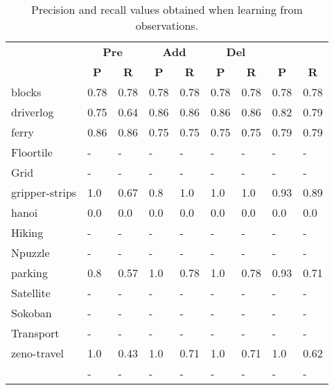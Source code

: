 \documentclass{article}
\begin{document}
\begin{table}
	\begin{footnotesize}
		\begin{center}
			\begin{tabular}{l|l|l|l|l|l|l||l|l|}
				& \multicolumn{2}{|c|}{\bf Pre} & \multicolumn{2}{|c|}{\bf Add} & \multicolumn{2}{|c||}{\bf Del} & \multicolumn{2}{|c}{\bf}\\ \cline{2-9}			
				& \multicolumn{1}{|c|}{\bf P} & \multicolumn{1}{|c|}{\bf R} & \multicolumn{1}{|c|}{\bf P} & \multicolumn{1}{|c|}{\bf R} & \multicolumn{1}{|c|}{\bf P} & \multicolumn{1}{|c||}{\bf R} &  \multicolumn{1}{|c|}{\bf P} & \multicolumn{1}{|c|}{\bf R} \\
				\hline
				blocks & 0.78 & 0.78 & 0.78 & 0.78 & 0.78 & 0.78 & 0.78 & 0.78 \\
				driverlog & 0.75 & 0.64 & 0.86 & 0.86 & 0.86 & 0.86 & 0.82 & 0.79 \\
				ferry & 0.86 & 0.86 & 0.75 & 0.75 & 0.75 & 0.75 & 0.79 & 0.79 \\
				Floortile & - & - & - & - & - & - & - & - \\ %
				Grid & - & - & - & - & - & - & - & - \\ %
				gripper-strips & 1.0 & 0.67 & 0.8 & 1.0 & 1.0 & 1.0 & 0.93 & 0.89 \\
				hanoi & 0.0 & 0.0 & 0.0 & 0.0 & 0.0 & 0.0 & 0.0 & 0.0 \\                                                                                                                                                                                     
				Hiking & - & - & - & - & - & - & - & - \\ %
				Npuzzle & - & - & - & - & - & - & - & - \\ %
				parking & 0.8 & 0.57 & 1.0 & 0.78 & 1.0 & 0.78 & 0.93 & 0.71 \\
				Satellite & - & - & - & - & - & - & - & - \\ %
				Sokoban & - & - & - & - & - & - & - & - \\ %
				Transport & - & - & - & - & - & - & - & - \\ %
				zeno-travel & 1.0 & 0.43 & 1.0 & 0.71 & 1.0 & 0.71 & 1.0 & 0.62 \\
				\hline
				\bf  & - & - & - & - & - & - & - & - \\
			\end{tabular}
		\end{center}
	\end{footnotesize}
	\caption{\small Precision and recall values obtained when learning from observations.}
	\label{fig:observations}       
\end{table}
\end{document}
